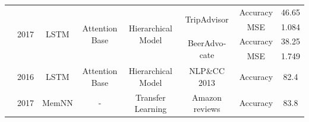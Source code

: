 \documentclass[12pt, a4paper, oneside]{report}
\begin{document}
\begin{tiny}
\begin{latin}
\begin{longtable}{|c|c|c|c|c|c|cc|}
        \multirow{4}{*}{\cite{yin-etal-2017-document}}       & \multirow{4}{*}{2017} & \multirow{4}{*}{LSTM}             & \multirow{4}{*}{Attention Base}         & \multirow{4}{*}{Hierarchical Model}                                                                    & \multirow{2}{*}{TripAdvisor}          & \multicolumn{1}{c|}{Accuracy}                                                                                                      & 46.65  \\ \cline{7-8} 
                                                                              &                       &                                   &                                         &                                                                                                        &                                       & \multicolumn{1}{c|}{MSE}                                                                                                           & 1.084  \\ \cline{6-8} 
                                                                              &                       &                                   &                                         &                                                                                                        & \multirow{2}{*}{BeerAdvocate}         & \multicolumn{1}{c|}{Accuracy}                                                                                                      & 38.25  \\ \cline{7-8} 
                                                                              &                       &                                   &                                         &                                                                                                        &                                       & \multicolumn{1}{c|}{MSE}                                                                                                           & 1.749  \\ \hline
        \cite{zhou-etal-2016-attention}                      & 2016                  & LSTM                              & Attention Base                          & Hierarchical Model                                                                                     & NLP\&CC 2013                          & \multicolumn{1}{c|}{Accuracy}                                                                                                      & 82.4   \\ \hline
        \cite{ijcai2017-311}                                 & 2017                  & MemNN                             & -                                       & Transfer Learning                                                                                      & Amazon reviews                        & \multicolumn{1}{c|}{Accuracy}                                                                                                      & 83.8   \\ \hline

\end{longtable}
\end{latin}
\end{tiny}
\end{document}
